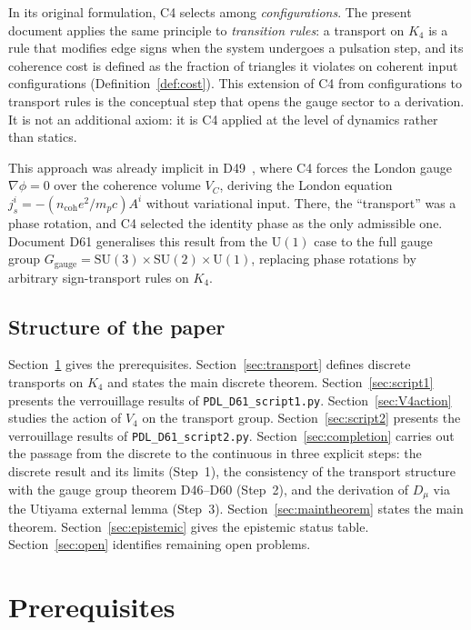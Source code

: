 \documentclass[11pt,a4paper]{article}
\theoremstyle{plain}
\theoremstyle{definition}
\theoremstyle{remark}
\newcommand{\Kfour}{K_4}
\newcommand{\Vfour}{V_4}
\newcommand{\Uone}{\mathrm{U}(1)}
\newcommand{\SUtwo}{\mathrm{SU}(2)}
\newcommand{\SUthree}{\mathrm{SU}(3)}
\newcommand{\Ggauge}{G_{\mathrm{gauge}}}
\newcommand{\Dmu}{D_\mu}
\begin{document}
In its original formulation, C4 selects among \emph{configurations}. The present
document applies the same principle to \emph{transition rules}: a transport on
$\Kfour$ is a rule that modifies edge signs when the system undergoes a pulsation
step, and its coherence cost is defined as the fraction of triangles it violates
on coherent input configurations (Definition~\ref{def:cost}). This extension of C4
from configurations to transport rules is the conceptual step that opens the gauge
sector to a derivation. It is not an additional axiom: it is C4 applied at the
level of dynamics rather than statics.

This approach was already implicit in D49~\cite{PDL_D49}, where C4 forces the
London gauge $\nabla\phi = 0$ over the coherence volume $V_C$, deriving the London
equation $j^i_s = -(n_{\mathrm{coh}} e^2 / m_p c) A^i$ without variational input.
There, the ``transport'' was a phase rotation, and C4 selected the identity phase
as the only admissible one. Document D61 generalises this result from the $\Uone$
case to the full gauge group $\Ggauge = \SUthree \times \SUtwo \times \Uone$,
replacing phase rotations by arbitrary sign-transport rules on $\Kfour$.

\subsection{Structure of the paper}

Section~\ref{sec:prereq} gives the prerequisites. Section~\ref{sec:transport}
defines discrete transports on $\Kfour$ and states the main discrete theorem.
Section~\ref{sec:script1} presents the verrouillage results of
\texttt{PDL\_D61\_script1.py}. Section~\ref{sec:V4action} studies the action of
$\Vfour$ on the transport group. Section~\ref{sec:script2} presents the verrouillage
results of \texttt{PDL\_D61\_script2.py}. Section~\ref{sec:completion} carries out the passage from the discrete to the
continuous in three explicit steps: the discrete result and its limits (Step~1),
the consistency of the transport structure with the gauge group theorem D46--D60
(Step~2), and the derivation of $\Dmu$ via the Utiyama external lemma (Step~3). Section~\ref{sec:maintheorem} states the main theorem.
Section~\ref{sec:epistemic} gives the epistemic status table. Section~\ref{sec:open}
identifies remaining open problems.

\section{Prerequisites}
\label{sec:prereq}
\end{document}
